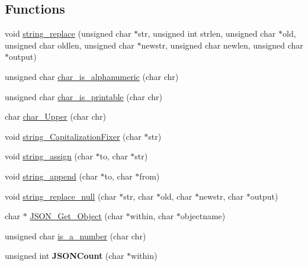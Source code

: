 \subsection*{\-Functions}
\begin{DoxyCompactItemize}
\item 
void \hyperlink{libfortune-0_81_8h_a34e8a513afcfa4403dffda13063965e1}{string\-\_\-replace} (unsigned char $\ast$str, unsigned int strlen, unsigned char $\ast$old, unsigned char oldlen, unsigned char $\ast$newstr, unsigned char newlen, unsigned char $\ast$output)
\item 
unsigned char \hyperlink{libfortune-0_81_8h_a2e810294066643b8000791d99fd1fde5}{char\-\_\-is\-\_\-alphanumeric} (char chr)
\item 
unsigned char \hyperlink{libfortune-0_81_8h_ad06e792d0883bbdb216202dba5c93a49}{char\-\_\-is\-\_\-printable} (char chr)
\item 
char \hyperlink{libfortune-0_81_8h_aad4c1f6d2aae5997bc9c56902a423169}{char\-\_\-\-Upper} (char chr)
\item 
void \hyperlink{libfortune-0_81_8h_aa97238a3b3c89c08eacae8eef4791ba2}{string\-\_\-\-Capitalization\-Fixer} (char $\ast$str)
\item 
void \hyperlink{libfortune-0_81_8h_af7779d4d40718fc33ce0d86ff73554e8}{string\-\_\-assign} (char $\ast$to, char $\ast$str)
\item 
void \hyperlink{libfortune-0_81_8h_ab62809f3ff93cae257d54b93016c7aef}{string\-\_\-append} (char $\ast$to, char $\ast$from)
\item 
void \hyperlink{libfortune-0_81_8h_af0154798b85d945348afb48a9a0a750a}{string\-\_\-replace\-\_\-null} (char $\ast$str, char $\ast$old, char $\ast$newstr, char $\ast$output)
\item 
char $\ast$ \hyperlink{libfortune-0_81_8h_ab377ac6d910580c12475a2c52c5a6fbd}{\-J\-S\-O\-N\-\_\-\-Get\-\_\-\-Object} (char $\ast$within, char $\ast$objectname)
\item 
unsigned char \hyperlink{libfortune-0_81_8h_ab80c73f7da157403f823fb5198308d9a}{is\-\_\-a\-\_\-number} (char chr)
\item 
\hypertarget{libfortune-0_81_8h_a36e67121efb9def3eb8d617d79a7bd5b}{unsigned int {\bfseries \-J\-S\-O\-N\-Count} (char $\ast$within)}\label{libfortune-0_81_8h_a36e67121efb9def3eb8d617d79a7bd5b}


\end{DoxyCompactItemize}
